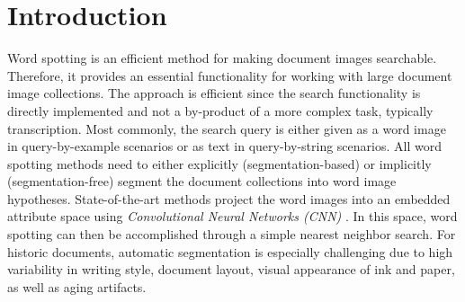 \section{Introduction}\label{sec:introduction}
Word spotting is an efficient method for making document images searchable. Therefore, it
provides an essential functionality for working with large document image collections. 
The approach is efficient since the search functionality is directly implemented and
not a by-product of a more complex task, typically transcription.
Most commonly, the search query is either given as a word image in query-by-example scenarios or as 
text in query-by-string scenarios.
All word spotting methods need to either explicitly (segmentation-based) or implicitly (segmentation-free) segment the document collections into word image hypotheses.
State-of-the-art methods project the word images into an embedded attribute space
\cite{Almazan14} using \emph{Convolutional Neural Networks (CNN)} \cite{Sudholt17, Wilkinson17}. 
In this space, word spotting can then be accomplished through a simple nearest neighbor search.
%
For historic documents, automatic segmentation is especially challenging due to high variability in
writing style, document layout, visual appearance of ink and paper, as well as aging artifacts. 

